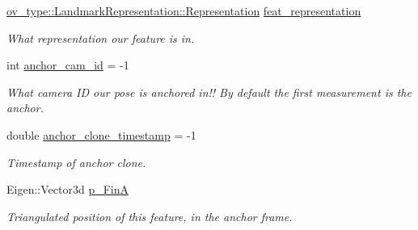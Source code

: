 \begin{DoxyCompactItemize}
\mbox{\label{structov__msckf_1_1UpdaterHelper_1_1UpdaterHelperFeature_a31e055121de04496fe06631b1352d62e}} 
\hyperlink{classov__type_1_1LandmarkRepresentation_a7f5783df6932ace7f098ae243b6d298e}{ov\+\_\+type\+::\+Landmark\+Representation\+::\+Representation} \hyperlink{structov__msckf_1_1UpdaterHelper_1_1UpdaterHelperFeature_a31e055121de04496fe06631b1352d62e}{feat\+\_\+representation}
\begin{DoxyCompactList}\small\item\em What representation our feature is in. \end{DoxyCompactList}\item 
\mbox{\label{structov__msckf_1_1UpdaterHelper_1_1UpdaterHelperFeature_a474d6bd5344818e899ba1b03c261fc9c}} 
int \hyperlink{structov__msckf_1_1UpdaterHelper_1_1UpdaterHelperFeature_a474d6bd5344818e899ba1b03c261fc9c}{anchor\+\_\+cam\+\_\+id} = -\/1
\begin{DoxyCompactList}\small\item\em What camera ID our pose is anchored in!! By default the first measurement is the anchor. \end{DoxyCompactList}\item 
\mbox{\label{structov__msckf_1_1UpdaterHelper_1_1UpdaterHelperFeature_a41aaaf3a4c85bb1669b0d56e78c5f851}} 
double \hyperlink{structov__msckf_1_1UpdaterHelper_1_1UpdaterHelperFeature_a41aaaf3a4c85bb1669b0d56e78c5f851}{anchor\+\_\+clone\+\_\+timestamp} = -\/1
\begin{DoxyCompactList}\small\item\em Timestamp of anchor clone. \end{DoxyCompactList}\item 
\mbox{\label{structov__msckf_1_1UpdaterHelper_1_1UpdaterHelperFeature_a2e0ab4cc6215ee1bff8ccbe0cefcc349}} 
Eigen\+::\+Vector3d \hyperlink{structov__msckf_1_1UpdaterHelper_1_1UpdaterHelperFeature_a2e0ab4cc6215ee1bff8ccbe0cefcc349}{p\+\_\+\+FinA}
\begin{DoxyCompactList}\small\item\em Triangulated position of this feature, in the anchor frame. \end{DoxyCompactList}\item 

\end{DoxyCompactItemize}
